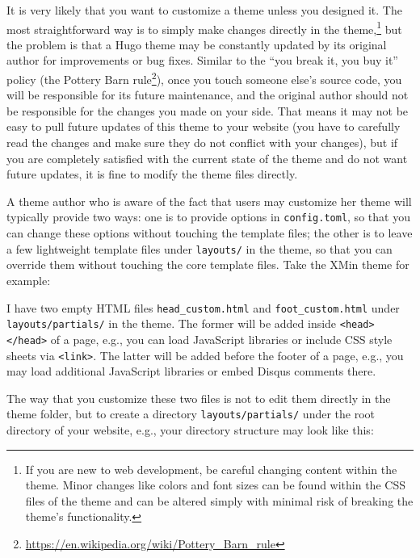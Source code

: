 \documentclass[12pt,]{krantz}
\renewcommand{\href}[2]{#2\footnote{\url{#1}}}
\theoremstyle{definition}
\theoremstyle{definition}
\theoremstyle{definition}
\theoremstyle{remark}
\begin{document}
It is very likely that you want to customize a theme unless you designed
it. The most straightforward way is to simply make changes directly in
the theme,\footnote{If you are new to web development, be careful
  changing content within the theme. Minor changes like colors and font
  sizes can be found within the CSS files of the theme and can be
  altered simply with minimal risk of breaking the theme's
  functionality.} but the problem is that a Hugo theme may be constantly
updated by its original author for improvements or bug fixes. Similar to
the ``you break it, you buy it'' policy (the
\href{https://en.wikipedia.org/wiki/Pottery_Barn_rule}{Pottery Barn
rule}), once you touch someone else's source code, you will be
responsible for its future maintenance, and the original author should
not be responsible for the changes you made on your side. That means it
may not be easy to pull future updates of this theme to your website
(you have to carefully read the changes and make sure they do not
conflict with your changes), but if you are completely satisfied with
the current state of the theme and do not want future updates, it is
fine to modify the theme files directly.

A theme author who is aware of the fact that users may customize her
theme will typically provide two ways: one is to provide options in
\texttt{config.toml}, so that you can change these options without
touching the template files; the other is to leave a few lightweight
template files under \texttt{layouts/} in the theme, so that you can
override them without touching the core template files. Take the XMin
theme for example:

I have two empty HTML files \texttt{head\_custom.html} and
\texttt{foot\_custom.html} under \texttt{layouts/partials/} in the
theme. The former will be added inside
\texttt{\textless{}head\textgreater{}\textless{}/head\textgreater{}} of
a page, e.g., you can load JavaScript libraries or include CSS style
sheets via \texttt{\textless{}link\textgreater{}}. The latter will be
added before the footer of a page, e.g., you may load additional
JavaScript libraries or embed Disqus comments there.

The way that you customize these two files is not to edit them directly
in the theme folder, but to create a directory
\texttt{layouts/partials/} under the root directory of your website,
e.g., your directory structure may look like this:
\end{document}
